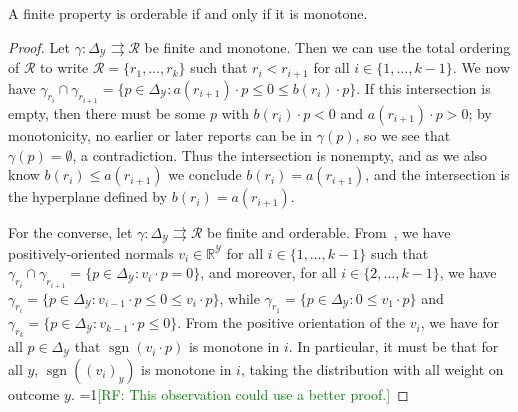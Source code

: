 \documentclass[anon,12pt]{colt2019}
\newcommand{\Comments}{1}
\newcommand{\mynote}[2]{\ifnum\Comments=1\textcolor{#1}{#2}\fi}
\newcommand{\raf}[1]{\mynote{green}{[RF: #1]}}
\newcommand{\reals}{\mathbb{R}}
\newcommand{\simplex}{\Delta_\Y}
\newcommand{\R}{\mathcal{R}}
\newcommand{\Y}{\mathcal{Y}}
\newcommand{\toto}{\rightrightarrows}
\newcommand{\ones}{\mathbbm{1}}
\DeclareMathOperator*{\sgn}{sgn}
\begin{document}
\begin{lemma}\label{lem:orderable-monotone}
  A finite property is orderable if and only if it is monotone.
\end{lemma}
\begin{proof}
  Let $\gamma:\simplex\toto\R$ be finite and monotone.
  Then we can use the total ordering of $\R$ to write $\R = \{r_1,\ldots,r_k\}$ such that $r_i < r_{i+1}$ for all $i \in \{1,\ldots,k-1\}$.
  We now have $\gamma_{r_i} \cap \gamma_{r_{i+1}} = \{p\in\simplex : a(r_{i+1}) \cdot p \leq 0 \leq b(r_i) \cdot p\}$.
  If this intersection is empty, then there must be some $p$ with $b(r_i) \cdot p < 0$ and $a(r_{i+1}) \cdot p > 0$; by monotonicity, no earlier or later reports can be in $\gamma(p)$, so we see that $\gamma(p) = \emptyset$, a contradiction.
  Thus the intersection is nonempty, and as we also know $b(r_i) \leq a(r_{i+1})$ we conclude $b(r_i) = a(r_{i+1})$, and the intersection is the hyperplane defined by $b(r_i) = a(r_{i+1})$.

  For the converse, let $\gamma:\simplex\toto\R$ be finite and orderable.
  From~\cite[Theorem 4]{lambert2018elicitation}, we have positively-oriented normals $v_i\in\reals^\Y$ for all $i \in \{1,\ldots,k-1\}$ such that $\gamma_{r_i} \cap \gamma_{r_{i+1}} = \{p\in\simplex : v_i\cdot p = 0\}$, and moreover, for all $i \in \{2,\ldots,k-1\}$, we have $\gamma_{r_i} = \{p\in\simplex : v_{i-1} \cdot p \leq 0 \leq v_i \cdot p\}$, while $\gamma_{r_1} = \{p\in\simplex : 0 \leq v_1 \cdot p\}$ and $\gamma_{r_k} = \{p\in\simplex : v_{k-1} \cdot p \leq 0\}$.
  From the positive orientation of the $v_i$, we have for all $p\in\simplex$ that $\sgn(v_i\cdot p)$ is monotone in $i$.
  In particular, it must be that for all $y$, $\sgn((v_i)_y)$ is monotone in $i$, taking the distribution with all weight on outcome $y$.
  \raf{This observation could use a better proof.}


\end{proof}
\end{document}
